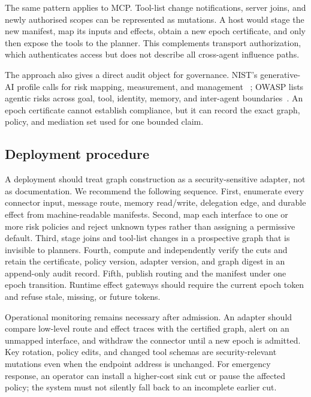 \documentclass[10pt,journal,compsoc]{IEEEtran}
\begin{document}
The same pattern applies to MCP.  Tool-list change notifications, server joins,
and newly authorised scopes can be represented as mutations.  A host would
stage the new manifest, map its inputs and effects, obtain a new epoch
certificate, and only then expose the tools to the planner.  This complements
transport authorization, which authenticates access but does not describe all
cross-agent influence paths.

The approach also gives a direct audit object for governance.  NIST's
generative-AI profile calls for risk mapping, measurement, and management
~\cite{nist2024gairmf}; OWASP lists agentic risks across goal, tool, identity,
memory, and inter-agent boundaries~\cite{owasp2026agentic}.  An epoch
certificate cannot establish compliance, but it can record the exact graph,
policy, and mediation set used for one bounded claim.

\subsection{Deployment procedure}

A deployment should treat graph construction as a security-sensitive adapter,
not as documentation.  We recommend the following sequence.  First, enumerate
every connector input, message route, memory read/write, delegation edge, and
durable effect from machine-readable manifests.  Second, map each interface to
one or more risk policies and reject unknown types rather than assigning a
permissive default.  Third, stage joins and tool-list changes in a prospective
graph that is invisible to planners.  Fourth, compute and independently verify
the cuts and retain the certificate, policy version, adapter version, and graph
digest in an append-only audit record.  Fifth, publish routing and the manifest
under one epoch transition.  Runtime effect gateways should require the current
epoch token and refuse stale, missing, or future tokens.

Operational monitoring remains necessary after admission.  An adapter should
compare low-level route and effect traces with the certified graph, alert on an
unmapped interface, and withdraw the connector until a new epoch is admitted.
Key rotation, policy edits, and changed tool schemas are security-relevant
mutations even when the endpoint address is unchanged.  For emergency response,
an operator can install a higher-cost sink cut or pause the affected policy;
the system must not silently fall back to an incomplete earlier cut.
\end{document}
